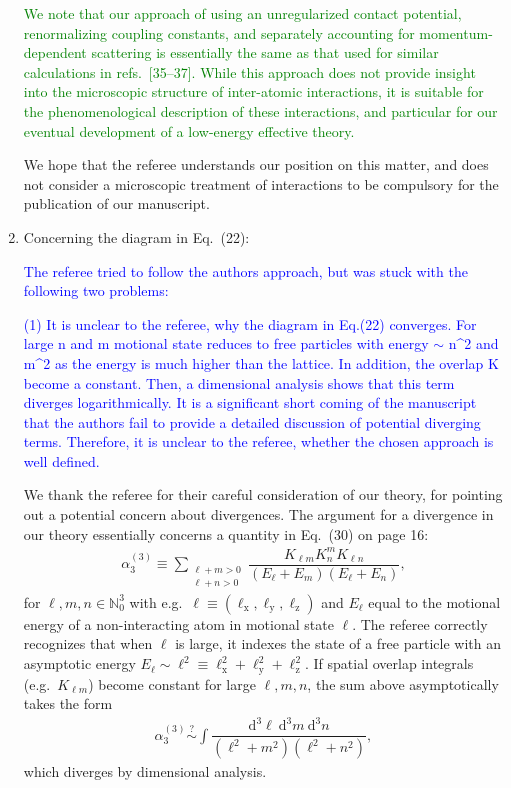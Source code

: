 \documentclass[preprint]{revtex4-1}
\newcommand{\f}{\dfrac} %
\newcommand{\p}[1]{\left(#1\right)} %
\renewcommand{\d}{\text{d}}
\newcommand{\x}{\text{x}}
\newcommand{\y}{\text{y}}
\newcommand{\z}{\text{z}}
\newcommand{\1}{\mathds{1}}
\newcommand{\blue}[1]{\textcolor{blue}{#1}}
\newcommand{\green}[1]{\textcolor{green}{#1}}
\begin{document}
\begin{enumerate}
  \green{We note that our approach of using an unregularized contact
    potential, renormalizing coupling constants, and separately
    accounting for momentum-dependent scattering is essentially the
    same as that used for similar calculations in refs.~[35--37].
    While this approach does not provide insight into the microscopic
    structure of inter-atomic interactions, it is suitable for the
    phenomenological description of these interactions, and particular
    for our eventual development of a low-energy effective theory.}

  We hope that the referee understands our position on this matter,
  and does not consider a microscopic treatment of interactions to be
  compulsory for the publication of our manuscript.


\item Concerning the diagram in Eq.~(22):

  \blue{The referee tried to follow the authors approach, but was
    stuck with the following two problems:}

  \blue{(1) It is unclear to the referee, why the diagram in Eq.(22)
    converges. For large n and m motional state reduces to free
    particles with energy $\sim$ n\^{}2 and m\^{}2 as the energy is
    much higher than the lattice. In addition, the overlap K become a
    constant. Then, a dimensional analysis shows that this term
    diverges logarithmically. It is a significant short coming of the
    manuscript that the authors fail to provide a detailed discussion
    of potential diverging terms. Therefore, it is unclear to the
    referee, whether the chosen approach is well defined.}

  \label{pt:divergence}

  We thank the referee for their careful consideration of our theory,
  for pointing out a potential concern about divergences.  The
  argument for a divergence in our theory essentially concerns a
  quantity in Eq.~(30) on page 16:
  \begin{align*}
    \alpha_3^{(3)} \equiv \sum_{\substack{\ell+m>0\\\ell+n>0}}
    \f{K_{\ell m} K^m_n K_{\ell n}}{\p{E_\ell+E_m}\p{E_\ell+E_n}},
  \end{align*}
  for $\ell,m,n\in\mathbb{N}_0^3$ with
  e.g.~$\ell\equiv\p{\ell_\x,\ell_\y,\ell_\z}$ and $E_\ell$ equal to
  the motional energy of a non-interacting atom in motional state
  $\ell$.  The referee correctly recognizes that when $\ell$ is large,
  it indexes the state of a free particle with an asymptotic energy
  $E_\ell\sim\ell^2\equiv\ell_\x^2+\ell_\y^2+\ell_\z^2$.  If spatial
  overlap integrals (e.g.~$K_{\ell m}$) become constant for large
  $\ell,m,n$, the sum above asymptotically takes the form
  \begin{align*}
    \alpha_3^{(3)} \stackrel{?}{\sim}
    \int \f{\d^3\ell~\d^3m~\d^3n}{\p{\ell^2+m^2}\p{\ell^2+n^2}},
  \end{align*}
  which diverges by dimensional analysis.


\end{enumerate}
\end{document}
